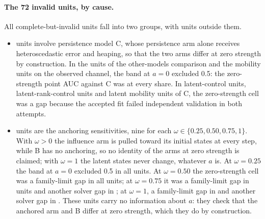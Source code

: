 \paragraph{The 72 invalid units, by cause.}
All  complete-but-invalid units fall into two groups, with  units outside them.
\begin{itemize}
\item {} units involve persistence model C, whose persistence arm alone receives heteroscedastic error and heaping, so that the two arms differ at zero strength by construction. In the  units of the other-models comparison and the  mobility units on the observed channel, the band at $a=0$ excluded 0.5: the zero-strength point AUC against C was  at every share. In  latent-control units,  latent-rank-control units and  latent mobility units of C, the zero-strength cell was a gap because the accepted fit failed independent validation in both attempts.
\item {} units are the anchoring sensitivities, nine for each $\omega\in\{0.25,0.50,0.75,1\}$. With $\omega>0$ the influence arm is pulled toward its initial states at every step, while B has no anchoring, so no identity of the arms at zero strength is claimed; with $\omega=1$ the latent states never change, whatever $a$ is. At $\omega=0.25$ the band at $a=0$ excluded 0.5 in all  units. At $\omega=0.50$ the zero-strength cell was a family-limit gap in all  units; at $\omega=0.75$ it was a family-limit gap in  units and another solver gap in ; at $\omega=1$, a family-limit gap in  and another solver gap in . These units carry no information about $a$: they check that the anchored arm and B differ at zero strength, which they do by construction.
\end{itemize}

